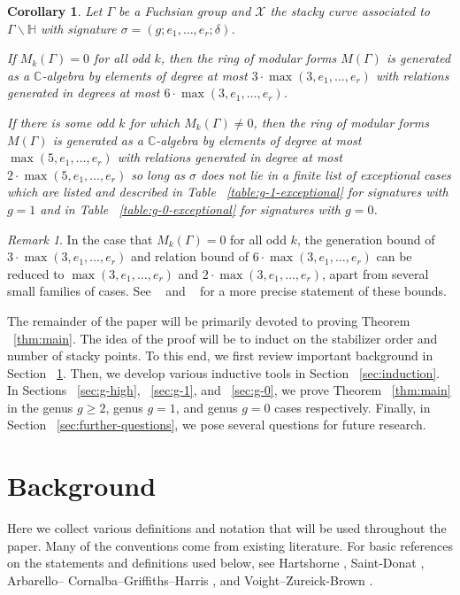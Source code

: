 \documentclass{amsart}
\theoremstyle{plain}
\newtheorem{cor}[thm]{Corollary}
\theoremstyle{definition}
\theoremstyle{remark}
\newtheorem{rem}[thm]{Remark}
\numberwithin{equation}{section}
\newcommand\BH{{\mathbb H}}
\newcommand\BC{{\mathbb C}}
\newcommand\sx{\mathscr X}
\begin{document}
\begin{cor}
\label{cor:main-mod-forms}
Let $\Gamma$ be a Fuchsian group and $\sx$ the stacky curve
associated to $\Gamma \backslash \BH$ with signature $\sigma
= (g; e_1, \ldots, e_r; \delta)$. 

If $M_k(\Gamma) = 0$ for all odd $k$, then the ring of modular
forms $M(\Gamma)$ is generated as a $\BC$-algebra by elements of
degree at most $3 \cdot \max(3, e_1, \ldots, e_r)$ with relations
generated in degrees at most $6 \cdot \max(3, e_1, \ldots, e_r)$.

If there is some odd $k$ for which $M_k(\Gamma) \neq 0$, then the
ring of modular forms $M(\Gamma)$ is generated as a $\BC$-algebra
by elements of degree at most $\max(5, e_1, \ldots, e_r)$ with
relations generated in degree at most $2 \cdot \max(5, e_1, \ldots, 
e_r)$ so long as $\sigma$ does not lie in a finite list of
exceptional cases which are listed and described in Table
~\ref{table:g-1-exceptional} for signatures with $g = 1$ and in
Table ~\ref{table:g-0-exceptional} for signatures with $g = 0$.
\end{cor}

\begin{rem}
In the case that $M_k(\Gamma) = 0$ for all odd $k$, the generation bound of $3 \cdot \max(3, e_1, \ldots, e_r)$ and relation
bound of $6 \cdot \max(3, e_1, \ldots, e_r)$ can be reduced to $\max(3,e_1, \ldots, e_r)$ and $2 \cdot \max(3,e_1, \ldots, e_r)$, apart from several small families of cases. See 
~\cite[Theorem 9.3.1]{vzb:stacky} and ~\cite[Theorem 9.3.1]{vzb:stacky} for a more precise statement of these bounds.
\end{rem}

The remainder of the paper will be primarily devoted to proving
Theorem ~\ref{thm:main}. The idea of the
proof will be to induct on the stabilizer order and number of stacky points. To this end, we first review important background in
Section ~\ref{sec:background}. Then, we develop various inductive
tools in Section ~\ref{sec:induction}. In Sections ~\ref{sec:g-high},
~\ref{sec:g-1}, and ~\ref{sec:g-0}, we prove Theorem
~\ref{thm:main} in the genus $ g \geq 2$, genus
$g = 1$, and genus $g = 0$ cases respectively. Finally, in Section
~\ref{sec:further-questions}, we pose several questions for future
research.


\section{Background}
\label{sec:background}
Here we collect various definitions and notation that will be
used throughout the paper. Many of the conventions come from existing
literature. For basic references on the statements and definitions
used below, see Hartshorne \cite[Chapter IV]{hartshorne:ag},
Saint-Donat \cite{saint-donat:proj}, Arbarello--
Cornalba--Griffiths--Harris \cite[Section III.2]
{acgh:algebraic-curves}, and Voight--Zureick-Brown \cite[Chapter 2,
Chapter 5]{vzb:stacky}.
\end{document}

